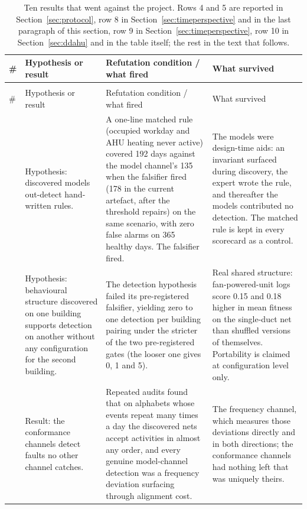 \documentclass[11pt,letterpaper]{article}
\begin{document}
{\small\setlength{\tabcolsep}{4pt}\renewcommand{\arraystretch}{1.15}\setlength{\LTcapwidth}{\textwidth}
\begin{longtable}{@{}>{\raggedright\arraybackslash}p{}>{\raggedright\arraybackslash}p{}>{\raggedright\arraybackslash}p{}>{\raggedright\arraybackslash}p{}@{}}
\caption{Ten results that went against the project. Rows 4 and 5 are reported in Section~\ref{sec:protocol}, row 8 in Section~\ref{sec:timeperspective} and in the last paragraph of this section, row 9 in Section~\ref{sec:timeperspective}, row 10 in Section~\ref{sec:ddahu} and in the table itself; the rest in the text that follows.}\label{tab:refuted}\\
\hline
\# & Hypothesis or result & Refutation condition / what fired & What survived \\
\hline
\endfirsthead
\multicolumn{4}{@{}l}{\emph{Table~\thetable{} (continued)}}\\
\hline
\# & Hypothesis or result & Refutation condition / what fired & What survived \\
\hline
\endhead
\hline
\endfoot
\endlastfoot
1 & Hypothesis: discovered models out-detect hand-written rules. & A one-line matched rule (occupied workday and AHU heating never active) covered 192 days against the model channel's 135 when the falsifier fired (178 in the current artefact, after the threshold repairs) on the same scenario, with zero false alarms on 365 healthy days. The falsifier fired. & The models were design-time aids: an invariant surfaced during discovery, the expert wrote the rule, and thereafter the models contributed no detection. The matched rule is kept in every scorecard as a control. \\
2 & Hypothesis: behavioural structure discovered on one building supports detection on another without any configuration for the second building. & The detection hypothesis failed its pre-registered falsifier, yielding zero to one detection per building pairing under the stricter of the two pre-registered gates (the looser one gives 0, 1 and 5). & Real shared structure: fan-powered-unit logs score 0.15 and 0.18 higher in mean fitness on the single-duct net than shuffled versions of themselves. Portability is claimed at configuration level only. \\
3 & Result: the conformance channels detect faults no other channel catches. & Repeated audits found that on alphabets whose events repeat many times a day the discovered nets accept activities in almost any order, and every genuine model-channel detection was a frequency deviation surfacing through alignment cost. & The frequency channel, which measures those deviations directly and in both directions; the conformance channels had nothing left that was uniquely theirs. \\

\end{longtable}}
\end{document}
